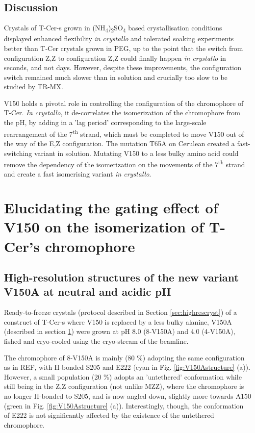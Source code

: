 \subsection{Discussion}

Crystals of T-Cer-s grown in  (NH\textsubscript{4})\textsubscript{2}SO\textsubscript{4} based crystallisation conditions displayed enhanced flexibility \textit{in crystallo} and tolerated soaking experiments better than T-Cer crystals grown in PEG, up to the point that the switch from configuration Z,Z to configuration Z,Z could finally happen \textit{in crystallo} in seconds, and not days. However, despite these improvements, the configuration switch remained much slower than in solution and crucially too slow to be studied by TR-MX. 

V150 holds a pivotal role in controlling the configuration of the chromophore of T-Cer. \textit{In crystallo}, it de-correlates the isomerization of the chromophore from the pH, by adding in a 'lag period' corresponding to the large-scale rearrangement of the 7\textsuperscript{th} strand, which must be completed to move V150 out of the way of the E,Z configuration. The mutation T65A on Cerulean created a fast-switching variant in solution. Mutating V150 to a less bulky amino acid could remove the dependency of the isomerization on the movements of  the 7\textsuperscript{th} strand and create a fast isomerising variant \textit{in crystallo}.

\section{Elucidating the gating effect of V150 on the isomerization of T-Cer's chromophore} \label{sec:V150A}
\subsection{High-resolution structures of the new variant V150A at neutral and acidic pH}
Ready-to-freeze crystals (protocol described in Section \ref{sec:highrescryst}) of a construct of T-Cer-s where V150 is replaced by a less bulky alanine, V150A (described in section \ref{sec:V150A}) were grown at pH 8.0 (8-V150A) and 4.0 (4-V150A), fished and cryo-cooled using the cryo-stream of the beamline.  

The chromophore of 8-V150A is mainly (80 \%) adopting the same configuration as in REF, with H-bonded S205 and E222 (cyan in Fig. \ref{fig:V150Astructure} (a)). However, a small population (20 \%) adopts an 'untethered' conformation while still being in the Z,Z configuration (not unlike MZZ), where the chromophore is no longer H-bonded to S205, and is now angled down, slightly more towards A150 (green in Fig. \ref{fig:V150Astructure} (a)). Interestingly, though, the conformation of E222 is not significantly affected by the existence of the untethered chromophore. 

